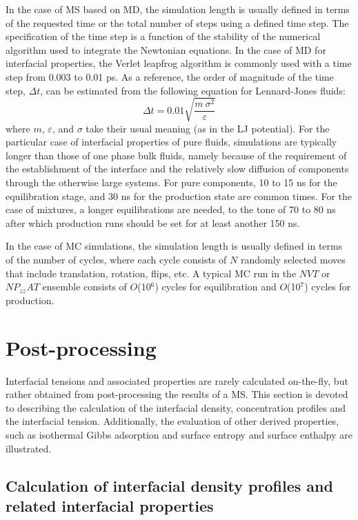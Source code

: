 \documentclass[9pt,bestpractices]{livecoms}
\begin{document}
In the case of MS based on MD, the simulation length is usually defined in
terms of the requested time or the total number of steps using a defined time
step. The specification of the time step is a function of the stability of the
numerical algorithm used to integrate the Newtonian equations. In the case of
MD for interfacial properties, the Verlet leapfrog algorithm is commonly used
with a time step from 0.003 to 0.01 ps. As a reference, the order of magnitude 
of the time step, $\Delta t$, can be estimated from the following equation
for Lennard-Jones fluids:
\begin{equation}
\Delta t=0.01\sqrt{\frac{m\:\sigma^{2}}{\varepsilon}}
\end{equation}
where $m$, $\varepsilon$, and $\sigma$  take their usual meaning (as
in the LJ potential). For the particular case of interfacial properties of pure
fluids, simulations are typically longer than those of one phase bulk fluids,
namely because of the requirement of the establishment of the interface and the
relatively slow diffusion of components through the otherwise large systems.
For pure components, 10 to 15 ns for the equilibration stage, and 30 ns for the
production state are common times. For the case of mixtures, a longer
equilibrations are needed, to the tone of 70 to 80 ns after which production
runs should be set for at least another 150 ns.

In the case of MC simulations, the simulation length is usually defined in
terms of the number of cycles, where each cycle consists of $N$ randomly
selected moves that include translation, rotation, flips, etc. A typical MC run
in the $NVT$ or $NP_{zz}AT$ ensemble consists of
$O$(10$^{6}$) cycles for equilibration and $O$(10$^{7}$) cycles
for production.

\section{Post-processing}
\label{sec:post-proc}
Interfacial tensions and associated properties are rarely calculated
on-the-fly, but rather obtained from post-processing the results of a MS. This
section is devoted to describing the calculation of the interfacial density,
concentration profiles and the interfacial tension. Additionally, the evaluation
of other derived
properties, such as isothermal Gibbs adsorption and surface entropy and surface
enthalpy are illustrated. 

\subsection{Calculation of interfacial density profiles and related interfacial properties}
\end{document}
